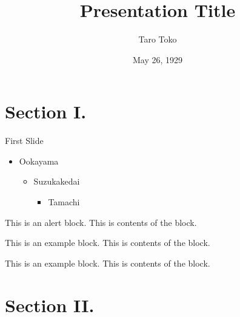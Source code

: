 \documentclass[dvipdfmx,unicode,10pt,aspectratio=43]{beamer}
\title{Presentation Title}
\author{Taro Toko}
\institute{Tokyo Institute of Technology}
\date{May 26, 1929}
\begin{document}
\begin{frame}
  \maketitle
\end{frame}

\section{Section I.}

\begin{frame}{First Slide}
  \begin{itemize}
  \item Ookayama
    \begin{itemize}
    \item Suzukakedai
      \begin{itemize}
      \item Tamachi
      \end{itemize}
    \end{itemize}
  \end{itemize}

  \begin{alertblock}{This is an alert block.}
    This is contents of the block.
  \end{alertblock}

  \begin{exampleblock}{This is an example block.}
    This is contents of the block.
  \end{exampleblock}

  \begin{block}{This is an example block.}
    This is contents of the block.
  \end{block}
\end{frame}

\section{Section II.}
\end{document}
